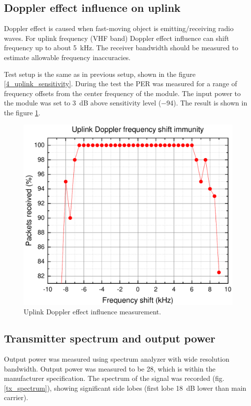 \subsection{Doppler effect influence on uplink}
Doppler effect is caused when fast-moving object is emitting/receiving radio waves. For uplink frequency (VHF band) Doppler effect influence can shift frequency up to about \SI{5}{\kHz}. The receiver bandwidth should be measured to estimate allowable frequency inaccuracies.

Test setup is the same as in previous setup, shown in the figure \ref{4_uplink_sensitivity}. During the test the PER was measured for a range of frequency offsets from the center frequency of the module. The input power to the module was set to \SI{3}{\dB} above sensitivity level (\SI{-94}{\dBm}).  The result is shown in the figure \ref{4_uplink_doppler_measurement}.
\begin{figure}[H]
    \centering
    \includegraphics[width=0.6\paperwidth]{img/6/uplink_doppler.pdf}
    \caption{Uplink Doppler effect influence measurement.}
    \label{4_uplink_doppler_measurement}
\end{figure}


\subsection{Transmitter spectrum and output power}
Output power was measured using spectrum analyzer with wide resolution bandwidth. Output power was measured to be \SI{28}{\dBm}, which is within the manufacturer specification.
The spectrum of the signal was recorded (fig. \ref{tx_spectrum}), showing significant side lobes (first lobe \SI{18}{\dB} lower than main carrier).

